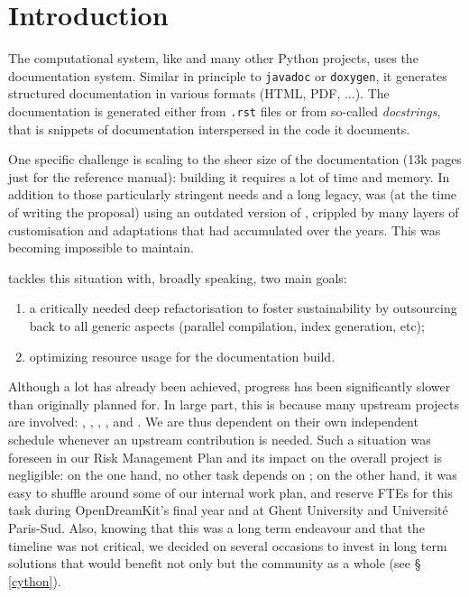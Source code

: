 \documentclass{deliverablereport}
\author{Jeroen Demeyer}
\begin{document}
\maketitle
\tableofcontents


\section{Introduction}

The \Sage computational system, like \Python and many other Python
projects, uses the \Sphinx documentation system. Similar in principle
to \lstinline{javadoc} or \lstinline{doxygen}, it generates structured
documentation in various formats (HTML, PDF, ...).
The documentation is generated either from \texttt{.rst} files
or from so-called \emph{docstrings}, that is snippets of documentation
interspersed in the code it documents.

One specific challenge is scaling to the sheer size of the \Sage
documentation (13k pages just for the reference manual): building it
requires a lot of time and memory. In addition to those particularly
stringent needs and a long legacy, \Sage was (at the time of writing
the proposal) using an outdated version of \Sphinx, crippled by many
layers of customisation and adaptations that had accumulated over the
years. This was becoming impossible to maintain.

 tackles this situation with, broadly
speaking, two main goals:
\begin{enumerate}
\item a critically needed deep refactorisation to
  foster sustainability by outsourcing back to
  \Sphinx all generic aspects (parallel compilation, index generation,
  etc);
\item optimizing resource usage for the documentation build.
\end{enumerate}

Although a lot has already been achieved, progress has been
significantly slower than originally planned for. In large part, this
is because many upstream projects are involved: \Sphinx, \Docutils,
\Pygments, \Cython, and \Python. We are thus dependent on their own
independent schedule whenever an upstream contribution is needed. Such
a situation was foreseen in our Risk Management Plan and its impact on
the overall project is negligible: on the one hand, no other task
depends on ; on the other hand, it was easy to
shuffle around some of our internal work plan, and reserve FTEs
for this task during OpenDreamKit's final year and at Ghent University
and Université Paris-Sud. Also, knowing that this was a long term
endeavour and that the timeline was not critical, we decided on
several occasions to invest in long term solutions that would benefit
not only \Sage but the community as a whole (see \S\,\ref{cython}).
\end{document}
